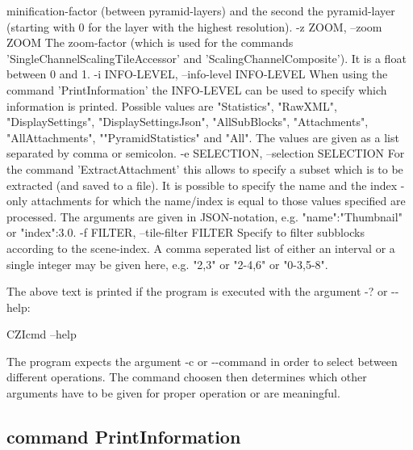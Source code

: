 \begin{DoxyVerb}
                      minification-factor (between pyramid-layers) and the
                      second the pyramid-layer (starting with 0 for the layer
                      with the highest resolution).
  -z ZOOM, --zoom ZOOM
                      The zoom-factor (which is used for the commands
                      'SingleChannelScalingTileAccessor' and
                      'ScalingChannelComposite'). It is a float between 0 and
                      1.
  -i INFO-LEVEL, --info-level INFO-LEVEL
                      When using the command 'PrintInformation' the INFO-LEVEL
                      can be used to specify which information is printed.
                      Possible values are "Statistics", "RawXML",
                      "DisplaySettings", "DisplaySettingsJson", "AllSubBlocks",
                      "Attachments", "AllAttachments", ""PyramidStatistics" and 
                      "All". The values are given as a list separated by comma 
                      or semicolon.
  -e SELECTION, --selection SELECTION
                      For the command 'ExtractAttachment' this allows to
                      specify a subset which is to be extracted (and saved to a
                      file). It is possible to specify the name and the index -
                      only attachments for which the name/index is equal to
                      those values specified are processed. The arguments are
                      given in JSON-notation, e.g. {"name":"Thumbnail"} or
                      {"index":3.0}.
  -f FILTER, --tile-filter FILTER
                      Specify to filter subblocks according to the scene-index.
                      A comma seperated list of either an interval or a single
                      integer may be given here, e.g. "2,3" or "2-4,6" or
                      "0-3,5-8".
\end{DoxyVerb}


The above text is printed if the program is executed with the argument \textquotesingle{}-\/?\textquotesingle{} or \textquotesingle{}-\/-\/help\textquotesingle{}\+: \begin{DoxyVerb}CZIcmd --help
\end{DoxyVerb}


The program expects the argument \textquotesingle{}-\/c\textquotesingle{} or \textquotesingle{}-\/-\/command\textquotesingle{} in order to select between different operations. The command choosen then determines which other arguments have to be given for proper operation or are meaningful.

\subsection*{command \textquotesingle{}Print\+Information\textquotesingle{}}


